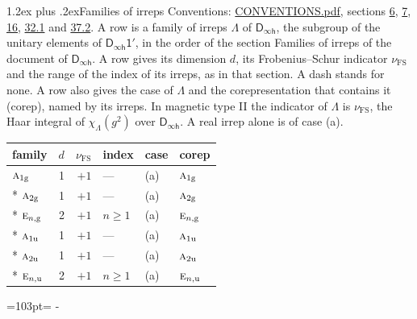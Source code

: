 \documentclass[10pt,a4paper]{article}
\makeatletter
\renewcommand\section{\@startsection{section}{1}{\z@}{-3ex plus -1ex minus -.2ex}%
  {1.2ex plus .2ex}{\normalfont\large\sffamily\bfseries\color{parttitle}}}
\newcommand{\needspace}[1]{\par\penalty-100\begingroup\dimen0=#1\relax\dimen2=\pagegoal
  \advance\dimen2-\pagetotal\ifdim\dimen0>\dimen2\relax\ifdim\dimen2>0pt\vfil\break\fi\fi
  \endgroup}
\numberwithin{equation}{section}
\newcommand{\grp}[1]{\mathsf{#1}}
\newcommand{\irr}[1]{\text{\normalfont\scshape #1}}
\newcommand{\ptag}[1]{\mathrm{#1}}
\newcommand{\irchar}[1]{\chi_{#1}}
\newcommand{\fsind}{\nu_{\mathrm{FS}}}
\makeatother
\begin{document}
\section{Families of irreps}\label{s:families}
Conventions: \href{../../CONVENTIONS.pdf}{CONVENTIONS.pdf}, sections \href{../../../rotation/CONVENTIONS.pdf\#conv.6}{6}, \href{../../../rotation/CONVENTIONS.pdf\#conv.7}{7}, \href{../../../rotation/CONVENTIONS.pdf\#conv.16}{16}, \href{../../CONVENTIONS.pdf\#conv.32.1}{32.1} and \href{../../CONVENTIONS.pdf\#conv.37.2}{37.2}.
\leavevmode\label{n:irrep.Delta}\label{n:head.family.irreps}A row is a family of irreps $\Lambda$ of $\grp{D_{\infty h}}$, the subgroup of the unitary elements of $\grp{D_{\infty h}1'}$, in the order of the section Families of irreps of the document of \href{../../../rotation/data/pdf/Dinfh.pdf}{$\grp{D_{\infty h}}$}. \label{n:index.dimension}\label{n:index.frobenius}\label{n:head.index.family}\label{n:index.family}A row gives its dimension $d$, its Frobenius--Schur indicator $\fsind$ and the range of the index of its irreps, as in that section. A dash stands for none. \label{n:head.case.corep}\label{n:head.corep}\label{n:function.character}A row also gives the case of $\Lambda$ and the corepresentation that contains it (corep), named by its irreps. In magnetic type II the indicator of $\Lambda$ is $\fsind$, the Haar integral of $\irchar{\Lambda}(g^2)$ over $\grp{D_{\infty h}}$. A real irrep alone is of case (a).
{\small\renewcommand{\arraystretch}{1.25}\begin{longtable}{@{}lrrlll@{}}\toprule
family & $d$ & $\fsind$ & index & case & corep\\\midrule\endhead
\bottomrule\endfoot\endlastfoot
$\irr{a}_{1\ptag{g}}$ & 1 & $+1$ & --- & (a) & $\irr{a}_{1\ptag{g}}$\\*
$\irr{a}_{2\ptag{g}}$ & 1 & $+1$ & --- & (a) & $\irr{a}_{2\ptag{g}}$\\*
$\irr{e}_{n,\ptag{g}}$ & 2 & $+1$ & $n \ge 1$ & (a) & $\irr{e}_{n,\ptag{g}}$\\*
$\irr{a}_{1\ptag{u}}$ & 1 & $+1$ & --- & (a) & $\irr{a}_{1\ptag{u}}$\\*
$\irr{a}_{2\ptag{u}}$ & 1 & $+1$ & --- & (a) & $\irr{a}_{2\ptag{u}}$\\*
$\irr{e}_{n,\ptag{u}}$ & 2 & $+1$ & $n \ge 1$ & (a) & $\irr{e}_{n,\ptag{u}}$\\
\bottomrule\end{longtable}}
\needspace{103pt}
\end{document}
